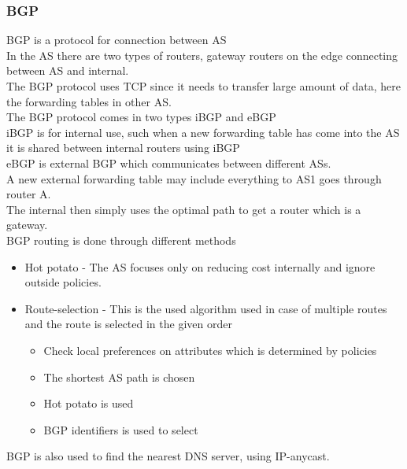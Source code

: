 \documentclass[12pt, a4paper]{article}
\begin{document}
			\subsubsection{BGP}
				BGP is a protocol for connection between AS\\
				In the AS there are two types of routers, gateway routers on the edge connecting between AS and internal.\\
				The BGP protocol uses TCP since it needs to transfer large amount of data, here the forwarding tables in other AS.\\
				The BGP protocol comes in two types iBGP and eBGP\\
				iBGP is for internal use, such when a new forwarding table has come into the AS it is shared between internal routers using iBGP\\
				eBGP is external BGP which communicates between different ASs.\\
				A new external forwarding table may include everything to AS1 goes through router A.\\
				The internal then simply uses the optimal path to get a router which is a gateway.\\
				BGP routing is done through different methods
				\begin{itemize}
					\item Hot potato - The AS focuses only on reducing cost internally and ignore outside policies.
					\item Route-selection - This is the used algorithm used in case of multiple routes and the route is selected in the given order
					\begin{itemize}
						\item Check local preferences on attributes which is determined by policies
						\item The shortest AS path is chosen
						\item Hot potato is used
						\item BGP identifiers is used to select
					\end{itemize}
				\end{itemize}
				BGP is also used to find the nearest DNS server, using IP-anycast.
\end{document}
